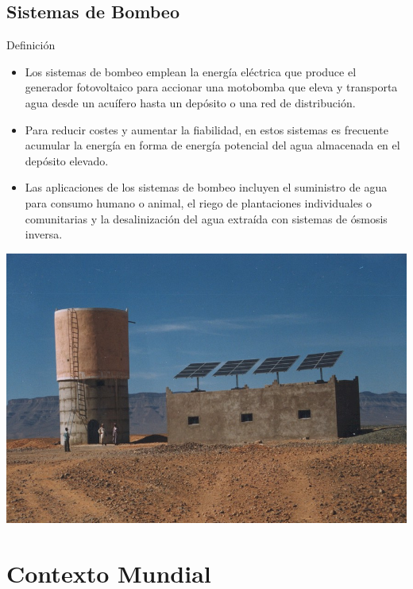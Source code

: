\documentclass[xcolor={usenames,svgnames,dvipsnames}]{beamer}
\begin{document}
\subsection{Sistemas de Bombeo}
\label{sec:org94278b8}
\begin{frame}[label={sec:org36dd43d}]{Definición}
\begin{itemize}
\item Los sistemas de bombeo emplean la energía eléctrica que produce el
generador fotovoltaico para accionar una motobomba que eleva y
transporta agua desde un acuífero hasta un depósito o una red de
distribución.

\item Para reducir costes y aumentar la fiabilidad, en estos sistemas es
frecuente acumular la energía en forma de energía potencial del agua
almacenada en el depósito elevado.

\item Las aplicaciones de los sistemas de bombeo incluyen el suministro de
agua para consumo humano o animal, el riego de plantaciones
individuales o comunitarias y la desalinización del agua extraída
con sistemas de ósmosis inversa.
\end{itemize}
\end{frame}
\begin{frame}[label={sec:org0c45b44}]{}
\begin{center}
\includegraphics[width=.9\linewidth]{../figs/Bombeo.jpg}
\end{center}
\end{frame}

\section{Contexto Mundial}
\label{sec:orge0820db}
\end{document}
